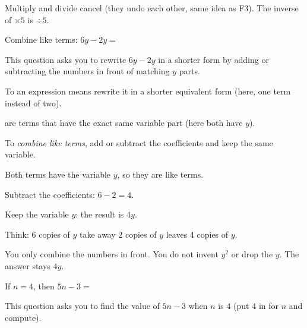 
\noindent Multiply and divide cancel (they undo each other, same idea as F3).
The inverse of $\times 5$ is $\div 5$.


\noindent Combine like terms: $6y - 2y = $\ansblank


\noindent This question asks you to rewrite $6y - 2y$ in a shorter form by
adding or subtracting the numbers in front of matching $y$ parts.

\begin{words}
  \item To an expression means rewrite it in a shorter equivalent form
        (here, one term instead of two).
  \item {}are terms that have the exact same variable part (here both
        have $y$).
  \item To \textit{combine like terms}, add or subtract the coefficients and keep the
        same variable.
\end{words}

\begin{steps}
  \item Both terms have the variable $y$, so they are like terms.
  \item Subtract the coefficients: $6 - 2 = 4$.
  \item Keep the variable $y$: the result is $4y$.
  \item Think: $6$ copies of $y$ take away $2$ copies of $y$ leaves $4$ copies of $y$.
\end{steps}


\noindent You only combine the numbers in front. You do not invent $y^{2}$ or
drop the $y$. The answer stays $4y$.


\noindent If $n = 4$, then $5n - 3 = $\ansblank


\noindent This question asks you to find the value of $5n - 3$ when $n$ is $4$
(put $4$ in for $n$ and compute).

